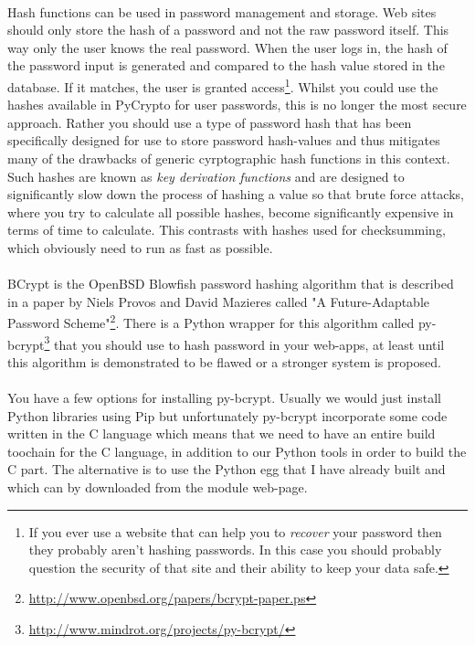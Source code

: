 \documentclass[12pt, a4paper, twoside]{book}
\begin{document}
\paragraph{} Hash functions can be used in password management and storage. Web sites should only store the hash of a password and not the raw password itself. This way only the user knows the real password. When the user logs in, the hash of the password input is generated and compared to the hash value stored in the database. If it matches, the user is granted access\footnote{If you ever use a website that can help you to \emph{recover} your password then they probably aren't hashing passwords. In this case you should probably question the security of that site and their ability to keep your data safe.}. Whilst you could use the hashes available in PyCrypto for user passwords, this is no longer the most secure approach. Rather you should use a type of password hash that has been specifically designed for use to store password hash-values and thus mitigates many of the drawbacks of generic cyrptographic hash functions in this context. Such hashes are known as \emph{key derivation functions} and are designed to significantly slow down the process of hashing a value so that brute force attacks, where you try to calculate all possible hashes, become significantly expensive in terms of time to calculate. This contrasts with hashes used for checksumming, which obviously need to run as fast as possible. 

\paragraph{} BCrypt is the OpenBSD Blowfish password hashing algorithm that is described in a paper by Niels Provos and David Mazieres called "A Future-Adaptable Password Scheme"\footnote{\url{http://www.openbsd.org/papers/bcrypt-paper.ps}}. There is a Python wrapper for this algorithm called py-bcrypt\footnote{\url{http://www.mindrot.org/projects/py-bcrypt/}} that you should use to hash password in your web-apps, at least until this algorithm is demonstrated to be flawed or a stronger system is proposed.

\paragraph{} You have a few options for installing py-bcrypt. Usually we would just install Python libraries using Pip but unfortunately py-bcrypt incorporate some code written in the C language which means that we need to have an entire build toochain for the C language, in addition to our Python tools in order to build the C part. The alternative is to use the Python egg that I have already built and which can by downloaded from the module web-page.
\end{document}
